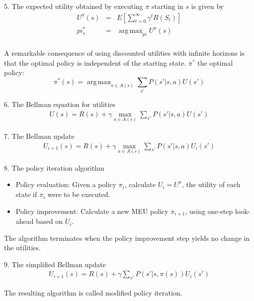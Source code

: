 \documentclass[12pt]{article}
\DeclareMathOperator*{\argmax}{arg\,max}
\begin{document}
5. The expected utility obtained by executing $\pi$ starting in $s$ is given by
\begin{eqnarray*}
U^{\pi}(s) &=& E \left[ \sum^{\infty}_{t=0} \gamma^t R(S_t) \right] \\
pi^*_s &=& \argmax_{pi} U^{\pi}(s) \\
\end{eqnarray*}

A remarkable consequence of using discounted utilities with infinite horizons is that the optimal policy is independent of the starting state. $\pi^*$ the optimal policy:
\begin{equation*}
\pi^*(s) = \argmax_{a \in A(s)} \sum_{s'} P(s'|s,a) U(s')
\end{equation*}

6. The Bellman equation for utilities
\begin{eqnarray*}
U(s) = R(s) + \gamma \max_{a \in A(s)} \sum_{s'} P(s' | s, a) U(s')
\end{eqnarray*}

7. The Bellman update
\begin{eqnarray*}
U_{i+1}(s) = R(s) + \gamma \max_{a \in A(s)} \sum_{s'} P(s' | s, a) U_i(s')
\end{eqnarray*}

8. The policy iteration algorithm
\begin{itemize}
\item Policy evaluation: Given a policy $\pi_i$, calculate $U_i = U^{\pi}$, the utility of each state if $\pi_i$ were to be executed.
\item Policy improvement: Calculate a new MEU policy $\pi_{i+1}$, using one-step look-ahead based on $U_i$.
\end{itemize}

The algorithm terminates when the policy improvement step yields no change in the utilities.

9. The simplified Bellman update
\begin{eqnarray*}
U_{i+1}(s) = R(s) + \gamma \sum_{s'} P(s' | s, \pi(s)) U_i(s')
\end{eqnarray*}

The resulting algorithm is called modified policy iteration.
\end{document}
